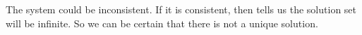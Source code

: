 The system could be inconsistent.  If it is consistent, then  tells us the solution set will be infinite.  So we can be certain that there is not a unique solution.
